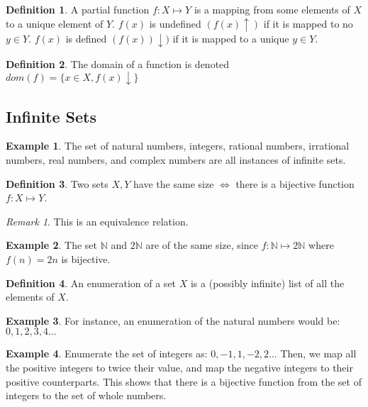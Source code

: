 \documentclass[11pt]{article}
\theoremstyle{plain} %
\theoremstyle{definition}
\newtheorem*{definition}{Definition} %
\theoremstyle{example}
\newtheorem*{example}{Example}
\theoremstyle{remark}
\newtheorem*{remark}{Remark}
\begin{document}
\begin{definition}
A partial function $f: X \mapsto Y$ is a mapping from some elements of $X$ to a unique element of $Y$. $f(x)$ is undefined $(f(x) \uparrow)$ if it is mapped to no $y \in Y$.
$f(x)$ is defined $(f(x)) \downarrow)$ if it is mapped to a unique $y \in Y$. 

\end{definition}
\begin{definition}
The domain of a function is denoted $dom(f) = \{x \in X, f(x) \downarrow\}$
\end{definition}

\subsection{Infinite Sets}

\begin{example}
The set of natural numbers, integers, rational numbers, irrational numbers, real numbers, and complex numbers are all instances of infinite sets.
\end{example}

\begin{definition}
Two sets $X, Y$ have the same size $\iff$ there is a bijective function $f:X \mapsto Y$.
\end{definition}

\begin{remark}
This is an equivalence relation.
\end{remark}

\begin{example}
The set $\mathbb N$ and $2\mathbb N$ are of the same size, since $f: \mathbb N \mapsto 2\mathbb N$ where $f(n) = 2n$ is bijective.
\end{example}

\begin{definition}
An enumeration of a set $X$ is a (possibly infinite) list of all the elements of $X$.
\end{definition}

\begin{example}
For instance, an enumeration of the natural numbers would be: $0,1,2,3,4...$
\end{example}

\begin{example}
Enumerate the set of integers as: $0,-1,1,-2,2...$ Then, we map all the positive integers to twice their value, and map the negative integers to their positive counterparts. This shows that there is a bijective function from the set of integers to the set of whole numbers.
\end{example}
\end{document}
